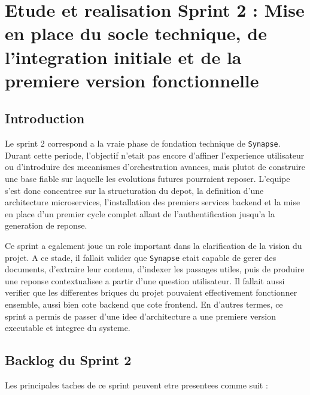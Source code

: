 \chapter{Etude et realisation Sprint 2 : Mise en place du socle technique, de l'integration initiale et de la premiere version fonctionnelle}

\section{Introduction}

Le sprint 2 correspond a la vraie phase de fondation technique de \texttt{Synapse}. Durant cette periode, l'objectif n'etait pas encore d'affiner l'experience utilisateur ou d'introduire des mecanismes d'orchestration avances, mais plutot de construire une base fiable sur laquelle les evolutions futures pourraient reposer. L'equipe s'est donc concentree sur la structuration du depot, la definition d'une architecture microservices, l'installation des premiers services backend et la mise en place d'un premier cycle complet allant de l'authentification jusqu'a la generation de reponse.

Ce sprint a egalement joue un role important dans la clarification de la vision du projet. A ce stade, il fallait valider que \texttt{Synapse} etait capable de gerer des documents, d'extraire leur contenu, d'indexer les passages utiles, puis de produire une reponse contextualisee a partir d'une question utilisateur. Il fallait aussi verifier que les differentes briques du projet pouvaient effectivement fonctionner ensemble, aussi bien cote backend que cote frontend. En d'autres termes, ce sprint a permis de passer d'une idee d'architecture a une premiere version executable et integree du systeme.

\section{Backlog du Sprint 2}

Les principales taches de ce sprint peuvent etre presentees comme suit :

